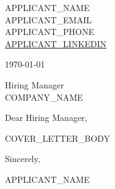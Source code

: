 \documentclass[11pt, letterpaper]{article}
\newcommand{\applicantname}{APPLICANT_NAME}
\newcommand{\applicantemail}{APPLICANT_EMAIL}
\newcommand{\applicantphone}{APPLICANT_PHONE}
\newcommand{\applicantlinkedin}{APPLICANT_LINKEDIN}
\begin{document}
\begin{flushright}
\applicantname \\
\applicantemail \\
\applicantphone \\
\href{https://\applicantlinkedin}{\applicantlinkedin}
\end{flushright}

\vspace{0.5em}
\today

\vspace{1em}
Hiring Manager \\
COMPANY\_NAME

\vspace{1em}
Dear Hiring Manager,

COVER\_LETTER\_BODY

\vspace{1em}
Sincerely,

\vspace{2em}
\applicantname
\end{document}
